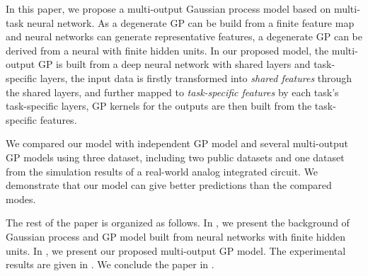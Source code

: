 In this paper, we propose a multi-output Gaussian process model based on multi-task neural network. As a degenerate GP can be build from a finite feature map and neural networks can generate representative features, a degenerate GP can be derived from a neural with finite hidden units\cite{lazaro2010marginalized, huang2015scalable}. In our proposed model, the multi-output GP is built from a deep neural network with shared layers and task-specific layers, the input data is firstly transformed into \emph{shared features} through the shared layers, and further mapped to \emph{task-specific features} by each task's task-specific layers, GP kernels for the outputs are then built from the task-specific features.

We compared our model with independent GP model and several multi-output GP models using three dataset, including two public datasets and one dataset from the simulation results of a real-world analog integrated circuit. We demonstrate that our model can give better predictions than the compared modes. 

The rest of the paper is organized as follows. In , we present the background of Gaussian process and GP model built from neural networks with finite hidden units. In , we present our proposed multi-output GP model. The experimental results are given in . We conclude the paper in . 

